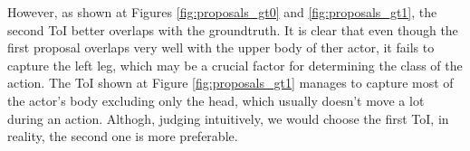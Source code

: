 However, as shown at Figures \ref{fig:proposals_gt0} and \ref{fig:proposals_gt1}, the second ToI better overlaps with the groundtruth. It is clear that even though
the first proposal overlaps very well with the upper body of ther actor, it fails to capture the left leg, which may be a crucial factor for determining the class of the
action. The ToI shown at Figure \ref{fig:proposals_gt1} manages to capture most of the actor's body excluding only the head, which usually doesn't move a lot
during an action. Althogh, judging intuitively, we would choose the first ToI, in reality, the second one is more preferable.


% 

